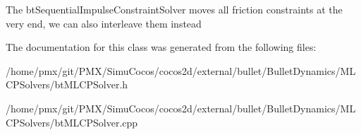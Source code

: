 The bt\+Sequential\+Impulse\+Constraint\+Solver moves all friction constraints at the very end, we can also interleave them instead 

The documentation for this class was generated from the following files\+:\begin{DoxyCompactItemize}
\item 
/home/pmx/git/\+P\+M\+X/\+Simu\+Cocos/cocos2d/external/bullet/\+Bullet\+Dynamics/\+M\+L\+C\+P\+Solvers/bt\+M\+L\+C\+P\+Solver.\+h\item 
/home/pmx/git/\+P\+M\+X/\+Simu\+Cocos/cocos2d/external/bullet/\+Bullet\+Dynamics/\+M\+L\+C\+P\+Solvers/bt\+M\+L\+C\+P\+Solver.\+cpp\end{DoxyCompactItemize}
